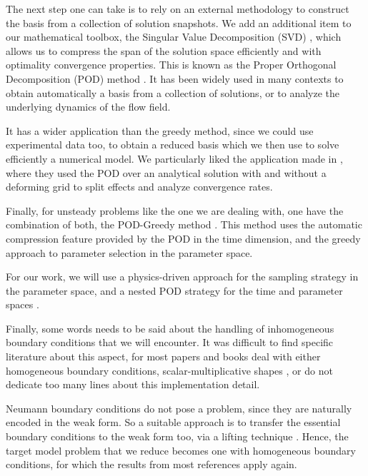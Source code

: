 \documentclass[literature_review.tex]{subfiles}
\begin{document}
The next step one can take is to rely on an external methodology
to construct the basis from a collection of solution snapshots.
We add an additional item to our mathematical toolbox,
the Singular Value Decomposition (SVD)
\cite{2000_POD_as_SVD},
which allows us to compress the span of the solution space
efficiently and with optimality convergence properties.
This is known as the Proper Orthogonal Decomposition (POD) method
\cite{1987_turbulenceDynamicsCoherentStructures_Sirovich,
Aubry1991}.
It has been widely used in many contexts 
to obtain automatically a basis from a collection of solutions,
or to analyze the underlying dynamics of the flow field.

It has a wider application than the greedy method,
since we could use experimental data too, 
to obtain a reduced basis which we then use to solve efficiently a numerical model.
We particularly liked the application made in
\cite{2003_podBasedReducedOrderModelsWithDeformingGrids_anttonen},
where they used the POD over an analytical solution 
with and without a deforming grid to split effects and analyze convergence rates.

Finally, for unsteady problems like the one we are dealing with,
one have the combination of both, the \mbox{POD-Greedy} method
\cite{Haasdonk2008, 
Haasdonk2013}.
This method uses the automatic compression feature provided by the POD in the time dimension,
and the greedy approach to parameter selection in the parameter space.

For our work, we will use a physics-driven approach for the sampling strategy in the parameter space,
and a nested POD strategy for the time and parameter spaces \cite{Santo_Manzoni_2019}.

Finally, some words needs to be said about the handling of inhomogeneous boundary conditions
that we will encounter.
It was difficult to find specific literature about this aspect,
for most papers and books deal with either homogeneous boundary conditions, 
scalar-multiplicative shapes 
\cite{separableBoundaryCondition,
separableBoundaryCondition_Two},
or do not dedicate too many lines about this implementation detail.

Neumann boundary conditions do not pose a problem, 
since they are naturally encoded in the weak form.
So a suitable approach is to transfer the essential boundary conditions to the weak form too,
via a lifting technique
\cite{2007_ReducedOrderModelingTimeDependentPDEsMultipleParametersBoundaryData_gunzburger}.
Hence, the target model problem that we reduce 
becomes one with homogeneous boundary conditions,
for which the results from most references apply again.
\end{document}
